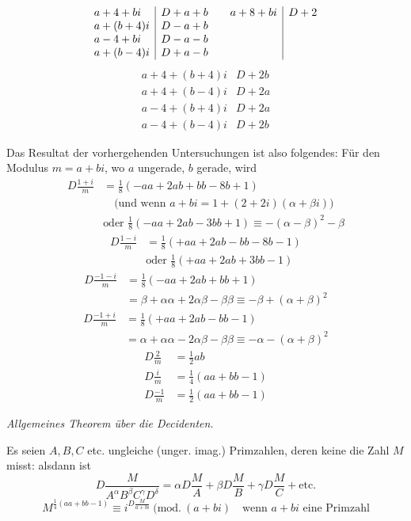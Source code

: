 %
\[
\begin{array}{l|l@{\qquad}l|l}
a+4+bi&D+a+b&a+8+bi&D+2\\
a+(b+4)i&D-a+b&&\\
a-4+bi&D-a-b&&\\
a+(b-4)i&D+a-b&&
\end{array}
\]
\[
\begin{array}{l|l}
a+4+(b+4)i&D+2b\\
a+4+(b-4)i&D+2a\\
a-4+(b+4)i&D+2a\\
a-4+(b-4)i&D+2b
\end{array}
\]

Das Resultat der vorhergehenden Untersuchungen ist also folgendes:
Für den Modulus $m=a+bi$, wo $a$ ungerade, $b$ gerade, wird
\[
\begin{aligned}
D\frac{1+i}{m}&=\tfrac18(-aa+2ab+bb-8b+1)\\
&\quad\text{(und wenn }a+bi=1+(2+2i)(\alpha+\beta i))\\
&\text{oder }\tfrac18(-aa+2ab-3bb+1)\equiv-(\alpha-\beta)^2-\beta
\end{aligned}
\]
\[
\begin{aligned}
D\frac{1-i}{m}&=\tfrac18(+aa+2ab-bb-8b-1)\\
&\text{oder }\tfrac18(+aa+2ab+3bb-1)
\end{aligned}
\]
\[
\begin{aligned}
D\frac{-1-i}{m}&=\tfrac18(-aa+2ab+bb+1)\\
&=\beta+\alpha\alpha+2\alpha\beta-\beta\beta\equiv-\beta+(\alpha+\beta)^2
\end{aligned}
\]
\[
\begin{aligned}
D\frac{-1+i}{m}&=\tfrac18(+aa+2ab-bb-1)\\
&=\alpha+\alpha\alpha-2\alpha\beta-\beta\beta\equiv-\alpha-(\alpha+\beta)^2
\end{aligned}
\]
\[
\begin{aligned}
D\frac2m&=\tfrac12ab\\
D\frac im&=\tfrac14(aa+bb-1)\\
D\frac{-1}m&=\tfrac12(aa+bb-1)
\end{aligned}
\]

\begin{center}\emph{Allgemeines Theorem über die Decidenten.}\end{center}
Es seien $A,B,C$ etc. ungleiche (unger. imag.) Primzahlen, deren keine die Zahl $M$ misst: alsdann ist
\[
D\frac{M}{A^\alpha B^\beta C^\gamma D^\delta}=\alpha D\frac MA+\beta D\frac MB+\gamma D\frac MC+\text{etc.}
\]
\[
M^{\frac14(aa+bb-1)}\equiv i^{D\frac{M}{a+bi}}\ (\mathrm{mod.}\ (a+bi)\quad\text{wenn }a+bi\text{ eine Primzahl}
\]

